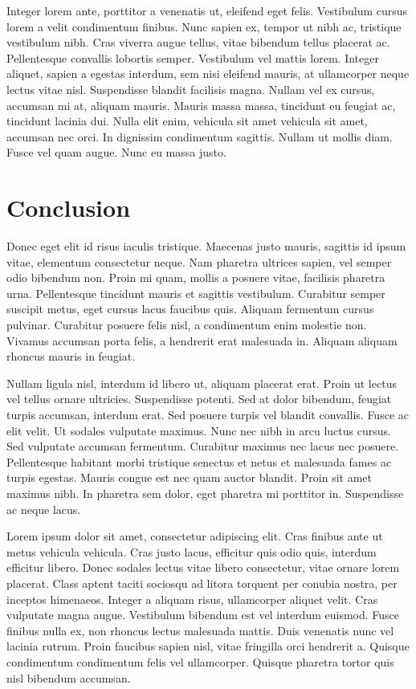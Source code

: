 \documentclass[a4paper]{article}
\begin{document}
\begin{multicols}{2}
Integer lorem ante, porttitor a venenatis ut, eleifend eget felis. Vestibulum cursus lorem a velit condimentum finibus. Nunc sapien ex, tempor ut nibh ac, tristique vestibulum nibh. Cras viverra augue tellus, vitae bibendum tellus placerat ac. Pellentesque convallis lobortis semper. Vestibulum vel mattis lorem. Integer aliquet, sapien a egestas interdum, sem nisi eleifend mauris, at ullamcorper neque lectus vitae nisl. Suspendisse blandit facilisis magna. Nullam vel ex cursus, accumsan mi at, aliquam mauris. Mauris massa massa, tincidunt eu feugiat ac, tincidunt lacinia dui. Nulla elit enim, vehicula sit amet vehicula sit amet, accumsan nec orci. In dignissim condimentum sagittis. Nullam ut mollis diam. Fusce vel quam augue. Nunc eu massa justo.

\section{Conclusion}
Donec eget elit id risus iaculis tristique. Maecenas justo mauris, sagittis id ipsum vitae, elementum consectetur neque. Nam pharetra ultrices sapien, vel semper odio bibendum non. Proin mi quam, mollis a posuere vitae, facilisis pharetra urna. Pellentesque tincidunt mauris et sagittis vestibulum. Curabitur semper suscipit metus, eget cursus lacus faucibus quis. Aliquam fermentum cursus pulvinar. Curabitur posuere felis nisl, a condimentum enim molestie non. Vivamus accumsan porta felis, a hendrerit erat malesuada in. Aliquam aliquam rhoncus mauris in feugiat.

Nullam ligula nisl, interdum id libero ut, aliquam placerat erat. Proin ut lectus vel tellus ornare ultricies. Suspendisse potenti. Sed at dolor bibendum, feugiat turpis accumsan, interdum erat. Sed posuere turpis vel blandit convallis. Fusce ac elit velit. Ut sodales vulputate maximus. Nunc nec nibh in arcu luctus cursus. Sed vulputate accumsan fermentum. Curabitur maximus nec lacus nec posuere. Pellentesque habitant morbi tristique senectus et netus et malesuada fames ac turpis egestas. Mauris congue est nec quam auctor blandit. Proin sit amet maximus nibh. In pharetra sem dolor, eget pharetra mi porttitor in. Suspendisse ac neque lacus.

Lorem ipsum dolor sit amet, consectetur adipiscing elit. Cras finibus ante ut metus vehicula vehicula. Cras justo lacus, efficitur quis odio quis, interdum efficitur libero. Donec sodales lectus vitae libero consectetur, vitae ornare lorem placerat. Class aptent taciti sociosqu ad litora torquent per conubia nostra, per inceptos himenaeos. Integer a aliquam risus, ullamcorper aliquet velit. Cras vulputate magna augue. Vestibulum bibendum est vel interdum euismod. Fusce finibus nulla ex, non rhoncus lectus malesuada mattis. Duis venenatis nunc vel lacinia rutrum. Proin faucibus sapien nisl, vitae fringilla orci hendrerit a. Quisque condimentum condimentum felis vel ullamcorper. Quisque pharetra tortor quis nisl bibendum accumsan.


\end{multicols}
\end{document}
